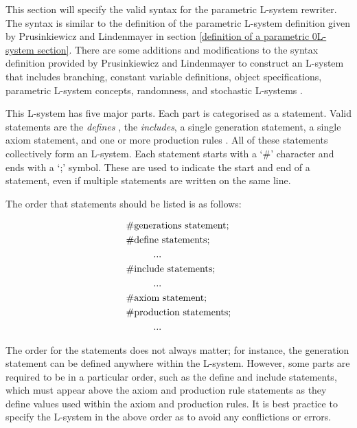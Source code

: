 This section will specify the valid syntax for the parametric L-system rewriter. The syntax is similar to the definition of the parametric L-system definition given by Prusinkiewicz and Lindenmayer in section \ref{definition of a parametric 0L-system section}. There are some additions and modifications to the syntax definition provided by Prusinkiewicz and Lindenmayer to construct an L-system that includes branching, constant variable definitions, object specifications, parametric L-system concepts, randomness, and stochastic L-systems \cite{prusinkiewicz2012algorithmic}. 

This L-system has five major parts. Each part is categorised as a statement. Valid statements are the \textit{defines} , the \textit{includes}, a single generation statement, a single axiom statement, and one or more production rules \cite{prusinkiewicz2013lindenmayer}. All of these statements collectively form an L-system. Each statement starts with a `\#' character and ends with a `;' symbol. These are used to indicate the start and end of a statement, even if multiple statements are written on the same line. 

The order that statements should be listed is as follows: 

\begin{equation} \label{statement order example}
\begin{aligned}
	&\text{\#generations statement;}\\
	&\text{\#define statements;}\\
	&\text{\hspace{10mm}...}\\
	&\text{\#include statements;}\\
	&\text{\hspace{10mm}...}\\
	&\text{\#axiom statement;}\\
	&\text{\#production statements;}\\
	&\text{\hspace{10mm}...}\\
\end{aligned}
\end{equation}

The order for the statements does not always matter; for instance, the generation statement can be defined anywhere within the L-system. However, some parts are required to be in a particular order, such as the define and include statements, which must appear above the axiom and production rule statements as they define values used within the axiom and production rules. It is best practice to specify the L-system in the above order as to avoid any conflictions or errors.

